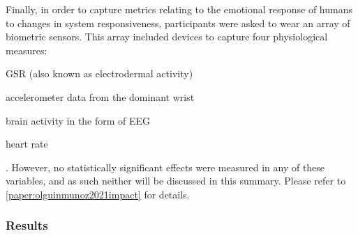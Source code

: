Finally, in order to capture metrics relating to the emotional response of humans to changes in system responsiveness, participants were asked to wear an array of biometric sensors.
This array included devices to capture four physiological measures:
\begin{enumerate*}[itemjoin={{, }}, itemjoin*={{, and }}, label={(\arabic*)}]
    \item \gls{GSR} (also known as electrodermal activity)
    \item accelerometer data from the dominant wrist
    \item brain activity in the form of \gls{EEG}
    \item heart rate
\end{enumerate*}.
However, no statistically significant effects were measured in any of these variables, and as such neither will be discussed in this summary.
Please refer to \cref{paper:olguinmunoz2021impact} for details.

\subsubsection{Results}

